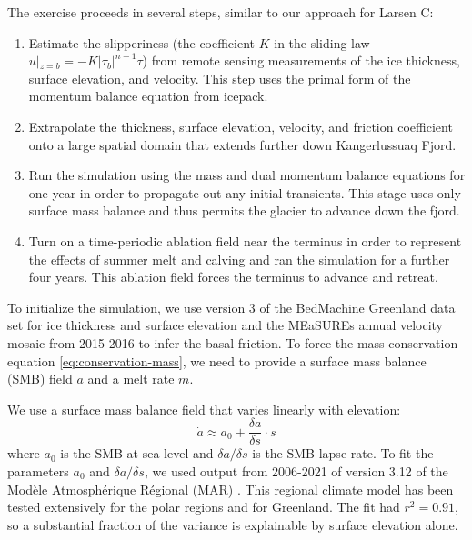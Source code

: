 \documentclass[review,oneside]{igs}
\begin{document}
The exercise proceeds in several steps, similar to our approach for Larsen C:
\begin{enumerate}
    \item Estimate the slipperiness (the coefficient $K$ in the sliding law $u|_{z = b} = -K|\tau_b|^{n - 1}\tau$) from remote sensing measurements of the ice thickness, surface elevation, and velocity.
        This step uses the primal form of the momentum balance equation from icepack.
    \item Extrapolate the thickness, surface elevation, velocity, and friction coefficient onto a large spatial domain that extends further down Kangerlussuaq Fjord.
    \item Run the simulation using the mass and dual momentum balance equations for one year in order to propagate out any initial transients.
        This stage uses only surface mass balance and thus permits the glacier to advance down the fjord.
    \item Turn on a time-periodic ablation field near the terminus in order to represent the effects of summer melt and calving and ran the simulation for a further four years.
        This ablation field forces the terminus to advance and retreat.
\end{enumerate}

To initialize the simulation, we use version 3 of the BedMachine Greenland data set for ice thickness and surface elevation \citep{morlighem2017bedmachine} and the MEaSUREs annual velocity mosaic from 2015-2016 \citep{joughin2010greenland} to infer the basal friction.
To force the mass conservation equation \eqref{eq:conservation-mass}, we need to provide a surface mass balance (SMB) field $\dot a$ and a melt rate $\dot m$.

We use a surface mass balance field that varies linearly with elevation:
\begin{equation}
    \dot a \approx a_0 + \frac{\delta a}{\delta s}\cdot s
\end{equation}
where $a_0$ is the SMB at sea level and $\delta a/\delta s$ is the SMB lapse rate.
To fit the parameters $a_0$ and $\delta a/\delta s$, we used output from 2006-2021 of version 3.12 of the Mod\`ele Atmosph\'erique R\'egional (MAR) \citep{fettweis2020grsmbmip}.
This regional climate model has been tested extensively for the polar regions and for Greenland.
The fit had $r^2 = 0.91$, so a substantial fraction of the variance is explainable by surface elevation alone.
\end{document}
